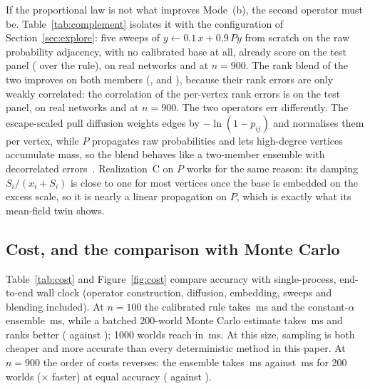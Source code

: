 \documentclass[11pt,a4paper]{article}
\theoremstyle{definition}
\theoremstyle{plain}
\begin{document}
If the proportional law is not what improves Mode~(b), the second operator must be. Table~\ref{tab:complement} isolates it with the configuration of Section~\ref{sec:explore}: five sweeps of $y\leftarrow0.1\,x+0.9\,Py$ from scratch on the raw probability adjacency, with no calibrated base at all, already score \RawPTest{} on the test panel (\RawPTestD{} over the rule), \RawPReal{} on real networks and \RawPScale{} at $n=900$. The rank blend of the two improves on both members (\BlendTest, \BlendReal{} and \BlendScale), because their rank errors are only weakly correlated: the correlation of the per-vertex rank errors is \ErrTest{} on the test panel, \ErrReal{} on real networks and \ErrScale{} at $n=900$. The two operators err differently. The escape-scaled pull diffusion weights edges by $-\ln(1-p_{ij})$ and normalises them per vertex, while $P$ propagates raw probabilities and lets high-degree vertices accumulate mass, so the blend behaves like a two-member ensemble with decorrelated errors~\cite{krogh95}. Realization~C on $P$ works for the same reason: its damping $S_i/(x_i+S_i)$ is close to one for most vertices once the base is embedded on the excess scale, so it is nearly a linear propagation on $P$, which is exactly what its mean-field twin shows.

\TabComplement

\subsection{Cost, and the comparison with Monte Carlo}\label{sec:cost}

Table~\ref{tab:cost} and Figure~\ref{fig:cost} compare accuracy with single-process, end-to-end wall clock (operator construction, diffusion, embedding, sweeps and blending included). At $n=100$ the calibrated rule takes \CostTestRuleMs\,ms and the constant-$\alpha$ ensemble \CostTestEnsMs\,ms, while a batched 200-world Monte Carlo estimate takes \CostTestMCTwoHundredMs\,ms and ranks better (\CostTestMCTwoHundredRho{} against \TestLinNine); 1000 worlds reach \CostTestMCThousandRho{} in \CostTestMCThousandMs\,ms. At this size, sampling is both cheaper and more accurate than every deterministic method in this paper. At $n=900$ the order of costs reverses: the ensemble takes \CostScaleEnsMs\,ms against \CostScaleMCTwoHundredMs\,ms for 200 worlds (\CostScaleSpeedup$\times$ faster) at equal accuracy (\ScaleLinNine{} against \CostScaleMCTwoHundredRho).
\end{document}
